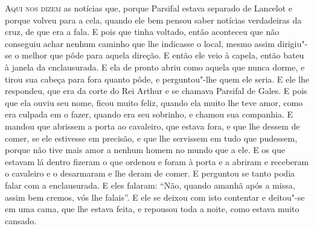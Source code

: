 \textsc{Aqui nos dizem} as notícias que, porque Parsifal estava separado de
Lancelot e porque volveu para a cela, quando ele bem pensou saber notícias
verdadeiras da cruz, de que era a fala. E pois que tinha voltado, então
aconteceu que não conseguiu achar nenhum caminho que lhe indicasse o local,
mesmo assim dirigiu"-se o melhor que pôde para aquela direção. E então ele veio
à capela, então bateu à janela da enclausurada. E ela de pronto abriu como
aquela que nunca dorme, e tirou sua cabeça para fora quanto pôde, e
perguntou"-lhe quem ele seria. E ele lhe respondeu, que era da corte do Rei
Arthur e se chamava Parsifal de Gales. E pois que ela ouviu seu nome, ficou
muito feliz, quando ela muito lhe teve amor, como era culpada em o fazer,
quando era seu sobrinho, e chamou sua companhia. E mandou que abrissem a porta
ao cavaleiro, que estava fora, e que lhe dessem de comer, se ele estivesse em
precisão, e que lhe servissem em tudo que pudessem, porque não tive mais amor a
nenhum homem no mundo que a ele. E os que estavam lá dentro fizeram o que
ordenou e foram à porta e a abriram e receberam o cavaleiro e o desarmaram e
lhe deram de comer. E perguntou se tanto podia falar com a enclausurada. E eles
falaram: “Não, quando amanhã após a missa, assim bem cremos, vós lhe falais”. E
ele se deixou com isto contentar e deitou"-se em uma cama, que lhe estava feita,
e repousou toda a noite, como estava muito cansado. 

